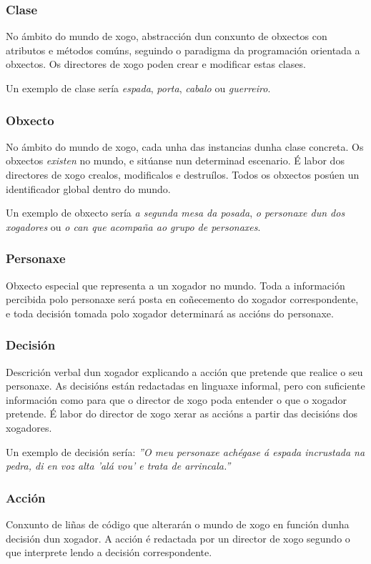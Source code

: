 \subsubsection{Clase}
No ámbito do mundo de xogo, abstracción dun conxunto de obxectos con atributos e
métodos comúns, seguindo o paradigma da programación orientada a obxectos. Os
directores de xogo poden crear e modificar estas clases.
\par
Un exemplo de clase sería {\it espada}, {\it porta}, {\it cabalo} ou {\it
guerreiro}.

\subsubsection{Obxecto}
No ámbito do mundo de xogo, cada unha das instancias dunha clase concreta. Os
obxectos {\it existen} no mundo, e sitúanse nun determinad escenario. É labor
dos directores de xogo crealos, modificalos e destruílos. Todos os obxectos
posúen un identificador global dentro do mundo.
\par
Un exemplo de obxecto sería {\it a segunda mesa da posada}, {\it o personaxe dun
dos xogadores} ou {\it o can que acompaña ao grupo de personaxes}.

\subsubsection{Personaxe}
Obxecto especial que representa a un xogador no mundo. Toda a información
percibida polo personaxe será posta en coñecemento do xogador correspondente, e
toda decisión tomada polo xogador determinará as accións do personaxe.

\subsubsection{Decisión}
Descrición verbal dun xogador explicando a acción que pretende que realice o seu
personaxe. As decisións están redactadas en linguaxe informal, pero con
suficiente información como para que o director de xogo poda entender o que o
xogador pretende. É labor do director de xogo xerar as accións a partir das
decisións dos xogadores.
\par
Un exemplo de decisión sería: {\it ''O meu personaxe achégase á espada
incrustada na pedra, di en voz alta 'alá vou' e trata de arrincala.''}

\subsubsection{Acción}
Conxunto de liñas de código que alterarán o mundo de xogo en función dunha
decisión dun xogador. A acción é redactada por un director de xogo segundo o que
interprete lendo a decisión correspondente.

